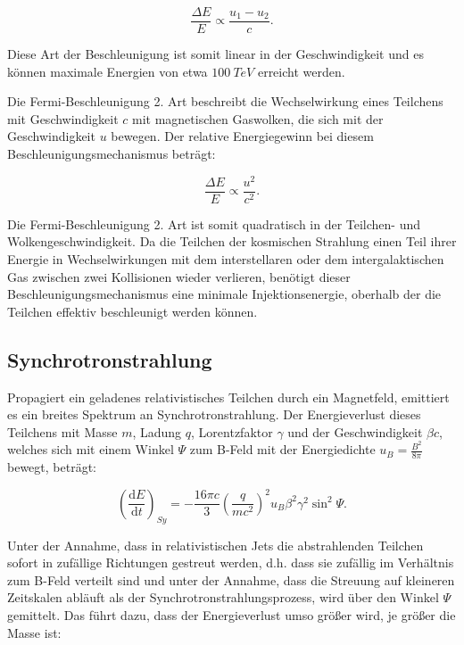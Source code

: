 \begin{equation}
 \frac{\Delta E}{E}\propto \frac{u_1-u_2}{c}.
\end{equation}

Diese Art der Beschleunigung ist somit linear in der Geschwindigkeit und es können maximale Energien von etwa $\SI{100}{TeV}$ erreicht werden.\cite{Grupen}\cite{Longair}

Die Fermi-Beschleunigung 2. Art beschreibt die Wechselwirkung eines Teilchens mit Geschwindigkeit $c$ mit magnetischen Gaswolken, die sich mit der Geschwindigkeit $u$ bewegen.
Der relative Energiegewinn bei diesem Beschleunigungsmechanismus beträgt:

\begin{equation}
 \frac{\Delta E}{E}\propto \frac{u^2}{c^2}.
\end{equation}

Die Fermi-Beschleunigung 2. Art ist somit quadratisch in der Teilchen- und Wolkengeschwindigkeit.
Da die Teilchen der kosmischen Strahlung einen Teil ihrer Energie in Wechselwirkungen mit dem interstellaren oder dem intergalaktischen Gas zwischen zwei Kollisionen wieder verlieren, benötigt dieser Beschleunigungsmechanismus eine minimale Injektionsenergie, oberhalb der die Teilchen effektiv beschleunigt werden können.\cite{Grupen}\cite{Longair}


\subsection{Synchrotronstrahlung}
Propagiert ein geladenes relativistisches Teilchen durch ein Magnetfeld, emittiert es ein breites Spektrum an Synchrotronstrahlung.
Der Energieverlust dieses Teilchens mit Masse $m$, Ladung $q$, Lorentzfaktor $\gamma$ und der Geschwindigkeit $\beta c$, welches sich mit einem Winkel $\Psi$ zum B-Feld mit der Energiedichte $u_B=\frac{B^2}{8\pi}$ bewegt, beträgt:

\begin{equation}
 \left( \frac{\mathrm{d}E}{\mathrm{d}t} \right)_{Sy} = - \frac{16 \pi c}{3} \left(\frac{q}{mc^2} \right)^2 u_B \beta^2 \gamma^2 \sin^2{\Psi}.
\end{equation}

Unter der Annahme, dass in relativistischen Jets die abstrahlenden Teilchen sofort in zufällige Richtungen gestreut werden, d.h. dass sie zufällig im Verhältnis zum B-Feld verteilt sind und unter der Annahme, dass die Streuung auf kleineren Zeitskalen abläuft als der Synchrotronstrahlungsprozess, wird über den Winkel $\Psi$ gemittelt.
Das führt dazu, dass der Energieverlust umso größer wird, je größer die Masse ist:

